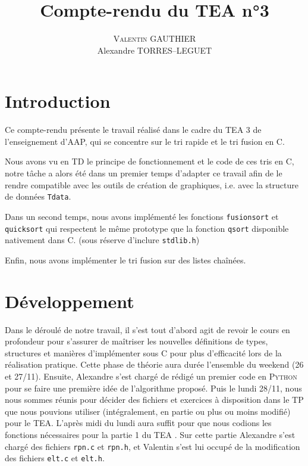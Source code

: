 \documentclass[11pt]{article}
\title{Compte-rendu du TEA n°3}
\author{\textsc{Valentin GAUTHIER}\\ Alexandre TORRES--LEGUET}
\begin{document}
\maketitle

\section{Introduction}

\quad \quad Ce compte-rendu présente le travail réalisé dans le cadre du TEA 3 de l'enseignement d'AAP, qui se concentre sur le tri rapide et le tri fusion en \textsc{C}.
 
Nous avons vu en TD le principe de fonctionnement et le code de ces tris en \textsc{C}, notre tâche a alors été dans un premier temps d'adapter ce travail afin de le rendre compatible avec les outils de création de graphiques, i.e. avec la structure de données \texttt{T\textunderscore data}. 

Dans un second temps, nous avons implémenté les fonctions \texttt{fusionsort} et \texttt{quicksort} qui respectent le même prototype que la fonction \texttt{qsort} disponible nativement dans \textsc{C}. (sous réserve d'inclure \texttt{stdlib.h})

Enfin, nous avons implémenter le tri fusion sur des listes chaînées.



\section{Développement}

\quad \quad Dans le déroulé de notre travail, il s’est tout d’abord agit de revoir le cours en profondeur pour s’assurer de maîtriser les nouvelles définitions de types, structures et manières d’implémenter sous \textsc{C} pour plus d’efficacité lors de la réalisation pratique. Cette phase de théorie aura durée l’ensemble du weekend (26 et 27/11). Ensuite, Alexandre s’est chargé de rédigé un premier code en \textsc{Python} pour se faire une première idée de l'algorithme proposé. Puis le lundi 28/11, nous nous sommes réunis pour décider des fichiers et exercices à disposition dans le TP que nous pouvions utiliser (intégralement, en partie ou plus ou moins modifié) pour le TEA. L’après midi du lundi aura suffit pour que nous codions les fonctions nécessaires pour la partie 1 du TEA . Sur cette partie Alexandre s’est chargé des fichiers \texttt{rpn.c} et \texttt{rpn.h}, et Valentin s’est lui occupé de la modification des fichiers \texttt{elt.c} et \texttt{elt.h}.
\end{document}
